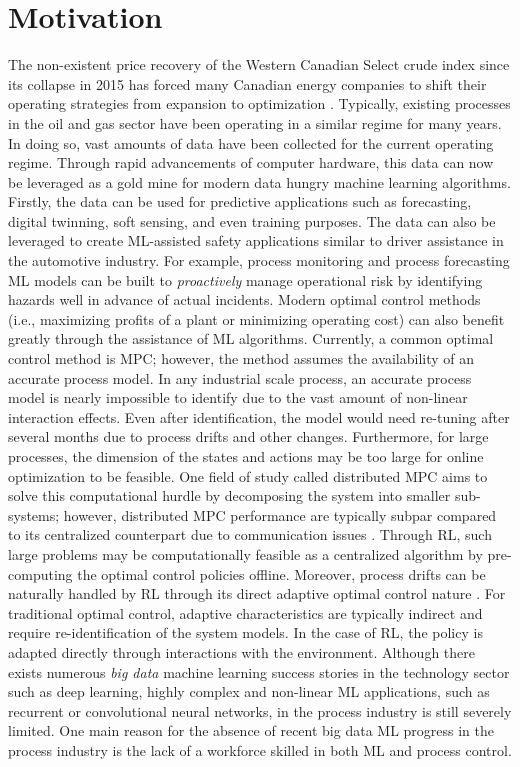 \section{Motivation}
The non-existent price recovery of the Western Canadian Select crude index since its collapse in 2015 has forced many Canadian energy companies to shift their operating strategies from expansion to optimization \cite{oil_price}.  Typically, existing processes in the oil and gas sector have been operating in a similar regime for many years.  In doing so, vast amounts of data have been collected for the current operating regime.  Through rapid advancements of computer hardware, this data can now be leveraged as a gold mine for modern data hungry machine learning algorithms.  Firstly, the data can be used for predictive applications such as forecasting, digital twinning, soft sensing, and even training purposes.  The data can also be leveraged to create ML-assisted safety applications similar to driver assistance in the automotive industry. For example, process monitoring and process forecasting ML models can be built to \textit{proactively} manage operational risk by identifying hazards well in advance of actual incidents. Modern optimal control methods (i.e., maximizing profits of a plant or minimizing operating cost) can also benefit greatly through the assistance of ML algorithms.  Currently, a common optimal control method is MPC; however, the method assumes the availability of an accurate process model.  In any industrial scale process, an accurate process model is nearly impossible to identify due to the vast amount of non-linear interaction effects.  Even after identification, the model would need re-tuning after several months due to process drifts and other changes. Furthermore, for large processes, the dimension of the states and actions may be too large for online optimization to be feasible. One field of study called distributed MPC aims to solve this computational hurdle by decomposing the system into smaller sub-systems; however, distributed MPC performance are typically subpar compared to its centralized counterpart due to communication issues \cite{distributed_mpc}. Through RL, such large problems may be computationally feasible as a centralized algorithm by pre-computing the optimal control policies offline. Moreover, process drifts can be naturally handled by RL through its direct adaptive optimal control nature \cite{direct_adaptive}.  For traditional optimal control, adaptive characteristics are typically indirect and require re-identification of the system models.  In the case of RL, the policy is adapted directly through interactions with the environment. Although there exists numerous \textit{big data} machine learning success stories in the technology sector such as deep learning, highly complex and non-linear ML applications, such as recurrent or convolutional neural networks, in the process industry is still severely limited. One main reason for the absence of recent big data ML progress in the process industry is the lack of a workforce skilled in both ML and process control.

